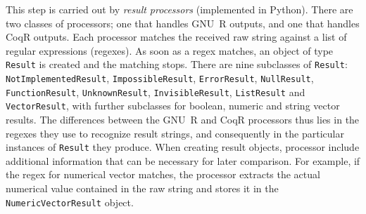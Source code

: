 \documentclass[
    sigplan,
    10pt,
    review, %
    natbib=false %
 ]{acmart}
\newcommand\CoqR{CoqR}
\begin{document}
This step is carried out by {\em result processors} (implemented in Python). There are two classes of processors; one that handles GNU~R outputs, and one that handles CoqR outputs.  Each processor matches the received raw string against a list of regular expressions (regexes). As soon as a regex matches, an object of type \texttt{Result} is created and the matching stops. There are nine subclasses of \texttt{Result}:
 \texttt{NotImplementedResult}, \texttt{ImpossibleResult}, \texttt{ErrorResult}, \texttt{NullResult}, \texttt{FunctionResult}, \texttt{UnknownResult}, \texttt{InvisibleResult},
 \texttt{ListResult} and \texttt{VectorResult}, with further subclasses for boolean, numeric and string vector results.
The differences between the GNU~R and \CoqR{} processors thus lies in the regexes they use to recognize result strings, and consequently in the particular instances of \texttt{Result} they produce.
%
When creating result objects, processor include additional information that can be necessary for later comparison. For example, if the regex for numerical vector matches, the processor extracts the actual numerical value contained in the raw string and stores it in the \texttt{NumericVectorResult} object. \\
\end{document}
